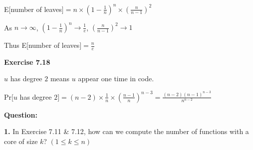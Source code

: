 \documentclass{article} %
\begin{document}
	E$[$number of leaves$]=n\times(1-\frac{1}{n})^{n}\times (\frac{n}{n-1})^2$\par
	As $n\rightarrow\infty$, $(1-\frac{1}{n})^{n}\rightarrow\frac{1}{e}$,  $(\frac{n}{n-1})^2\rightarrow1$\par
	Thus E$[$number of leaves$]=\frac{n}{e}$\par
	\textbf{Exercise 7.18}\par
	$u$ has degree $2$ means $u$ appear one time in code.\par
	Pr$[u$ has degree $2]=(n-2)\times\frac{1}{n}\times(\frac{n-1}{n})^{n-3}=\frac{(n-2)(n-1)^{n-3}}{n^{n-2}}$\par
	\textbf{Question:}\par
	\textbf{1.}  In Exercise 7.11 \& 7.12, how can we compute the number of functions with a core of size $k$? $(1\leq k\leq n)$
\end{document}
